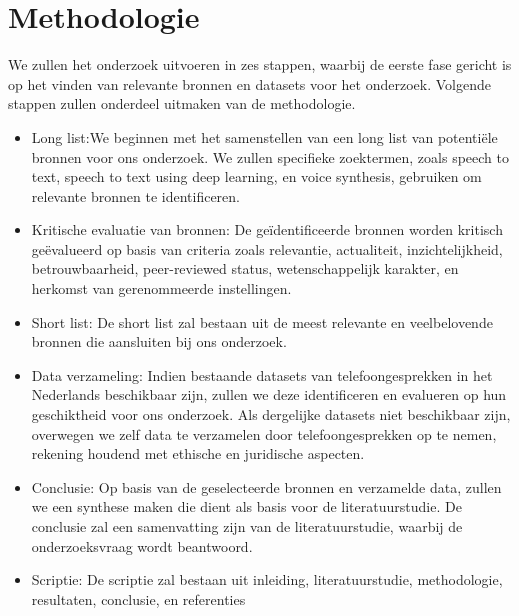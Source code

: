 \section{Methodologie}%
\label{sec:methodologie}

We zullen het onderzoek uitvoeren in zes stappen, waarbij de eerste fase gericht is op het vinden van relevante bronnen en datasets voor het onderzoek. Volgende stappen zullen onderdeel uitmaken van de methodologie.

\begin{itemize}
    \item Long list:We beginnen met het samenstellen van een long list van potentiële bronnen voor ons onderzoek. We zullen specifieke zoektermen, zoals speech to text, speech to text using deep learning, en voice synthesis, gebruiken om relevante bronnen te identificeren.
    \item Kritische evaluatie van bronnen: De geïdentificeerde bronnen worden kritisch geëvalueerd op basis van criteria zoals relevantie, actualiteit, inzichtelijkheid, betrouwbaarheid, peer-reviewed status, wetenschappelijk karakter, en herkomst van gerenommeerde instellingen.
    \item Short list: De short list zal bestaan uit de meest relevante en veelbelovende bronnen die aansluiten bij ons onderzoek.
    \item Data verzameling: Indien bestaande datasets van telefoongesprekken in het Nederlands beschikbaar zijn, zullen we deze identificeren en evalueren op hun geschiktheid voor ons onderzoek. Als dergelijke datasets niet beschikbaar zijn, overwegen we zelf data te verzamelen door telefoongesprekken op te nemen, rekening houdend met ethische en juridische aspecten.
    \item Conclusie: Op basis van de geselecteerde bronnen en verzamelde data, zullen we een synthese maken die dient als basis voor de literatuurstudie. De conclusie zal een samenvatting zijn van de literatuurstudie, waarbij de onderzoeksvraag wordt beantwoord.
    \item Scriptie: De scriptie zal bestaan uit inleiding, literatuurstudie, methodologie, resultaten, conclusie, en referenties
\end{itemize}

